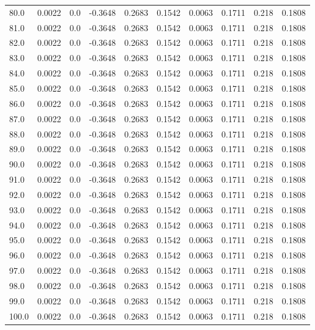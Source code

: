 \begin{longtable}{lrrrrrrrrr}
80.0 & 0.0022 & 0.0 & -0.3648 & 0.2683 & 0.1542 & 0.0063 & 0.1711 & 0.218 & 0.1808 \\
81.0 & 0.0022 & 0.0 & -0.3648 & 0.2683 & 0.1542 & 0.0063 & 0.1711 & 0.218 & 0.1808 \\
82.0 & 0.0022 & 0.0 & -0.3648 & 0.2683 & 0.1542 & 0.0063 & 0.1711 & 0.218 & 0.1808 \\
83.0 & 0.0022 & 0.0 & -0.3648 & 0.2683 & 0.1542 & 0.0063 & 0.1711 & 0.218 & 0.1808 \\
84.0 & 0.0022 & 0.0 & -0.3648 & 0.2683 & 0.1542 & 0.0063 & 0.1711 & 0.218 & 0.1808 \\
85.0 & 0.0022 & 0.0 & -0.3648 & 0.2683 & 0.1542 & 0.0063 & 0.1711 & 0.218 & 0.1808 \\
86.0 & 0.0022 & 0.0 & -0.3648 & 0.2683 & 0.1542 & 0.0063 & 0.1711 & 0.218 & 0.1808 \\
87.0 & 0.0022 & 0.0 & -0.3648 & 0.2683 & 0.1542 & 0.0063 & 0.1711 & 0.218 & 0.1808 \\
88.0 & 0.0022 & 0.0 & -0.3648 & 0.2683 & 0.1542 & 0.0063 & 0.1711 & 0.218 & 0.1808 \\
89.0 & 0.0022 & 0.0 & -0.3648 & 0.2683 & 0.1542 & 0.0063 & 0.1711 & 0.218 & 0.1808 \\
90.0 & 0.0022 & 0.0 & -0.3648 & 0.2683 & 0.1542 & 0.0063 & 0.1711 & 0.218 & 0.1808 \\
91.0 & 0.0022 & 0.0 & -0.3648 & 0.2683 & 0.1542 & 0.0063 & 0.1711 & 0.218 & 0.1808 \\
92.0 & 0.0022 & 0.0 & -0.3648 & 0.2683 & 0.1542 & 0.0063 & 0.1711 & 0.218 & 0.1808 \\
93.0 & 0.0022 & 0.0 & -0.3648 & 0.2683 & 0.1542 & 0.0063 & 0.1711 & 0.218 & 0.1808 \\
94.0 & 0.0022 & 0.0 & -0.3648 & 0.2683 & 0.1542 & 0.0063 & 0.1711 & 0.218 & 0.1808 \\
95.0 & 0.0022 & 0.0 & -0.3648 & 0.2683 & 0.1542 & 0.0063 & 0.1711 & 0.218 & 0.1808 \\
96.0 & 0.0022 & 0.0 & -0.3648 & 0.2683 & 0.1542 & 0.0063 & 0.1711 & 0.218 & 0.1808 \\
97.0 & 0.0022 & 0.0 & -0.3648 & 0.2683 & 0.1542 & 0.0063 & 0.1711 & 0.218 & 0.1808 \\
98.0 & 0.0022 & 0.0 & -0.3648 & 0.2683 & 0.1542 & 0.0063 & 0.1711 & 0.218 & 0.1808 \\
99.0 & 0.0022 & 0.0 & -0.3648 & 0.2683 & 0.1542 & 0.0063 & 0.1711 & 0.218 & 0.1808 \\
100.0 & 0.0022 & 0.0 & -0.3648 & 0.2683 & 0.1542 & 0.0063 & 0.1711 & 0.218 & 0.1808 \\

\end{longtable}
